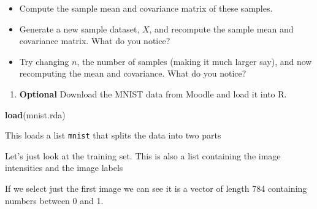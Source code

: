 \documentclass[
]{book}
\newenvironment{Shaded}{\begin{snugshade}}{\end{snugshade}}
\newcommand{\CommentTok}[1]{\textcolor[rgb]{0.56,0.35,0.01}{\textit{#1}}}
\newcommand{\DocumentationTok}[1]{\textcolor[rgb]{0.56,0.35,0.01}{\textbf{\textit{#1}}}}
\newcommand{\FunctionTok}[1]{\textcolor[rgb]{0.13,0.29,0.53}{\textbf{#1}}}
\newcommand{\NormalTok}[1]{#1}
\newcommand{\SpecialCharTok}[1]{\textcolor[rgb]{0.81,0.36,0.00}{\textbf{#1}}}
\newcommand{\StringTok}[1]{\textcolor[rgb]{0.31,0.60,0.02}{#1}}
\providecommand{\tightlist}{%
  \setlength{\itemsep}{0pt}\setlength{\parskip}{0pt}}
\theoremstyle{definition}
\theoremstyle{definition}
\theoremstyle{definition}
\theoremstyle{definition}
\theoremstyle{remark}
\begin{document}
\begin{itemize}
\tightlist
\item
  Compute the sample mean and covariance matrix of these samples.
\item
  Generate a new sample dataset, \(X\), and recompute the sample mean and covariance matrix. What do you notice?
\item
  Try changing \(n\), the number of samples (making it much larger say), and now recomputing the mean and covariance. What do you notice?
\end{itemize}

\begin{enumerate}
\def\labelenumi{\arabic{enumi}.}
\setcounter{enumi}{4}
\tightlist
\item
  \textbf{Optional} Download the MNIST data from Moodle and load it into R.
\end{enumerate}

\begin{Shaded}
\begin{Highlighting}[]
\FunctionTok{load}\NormalTok{(}\StringTok{\textquotesingle{}mnist.rda\textquotesingle{}}\NormalTok{)}
\end{Highlighting}
\end{Shaded}

This loads a list \texttt{mnist} that splits the data into two parts

\begin{Shaded}
\end{Shaded}

Let's just look at the training set. This is also a list containing the image intensities and the image labels

\begin{Shaded}
\end{Shaded}

If we select just the first image we can see it is a vector of length 784 containing numbers between 0 and 1.
\end{document}
